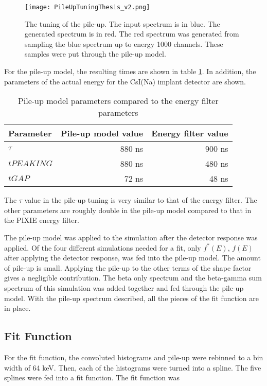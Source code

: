 \documentclass[../MaxHughesThesis.tex]{subfiles}
\begin{document}
\begin{figure}[!htb]
	\centerline{\texttt{[image: PileUpTuningThesis\_v2.png]}}
	\caption{The tuning of the pile-up.
		 The input spectrum is in blue.
		 The generated spectrum is in red.
		 The red spectrum was generated from sampling the blue spectrum up to energy 1000 channels.
		 These samples were put through the pile-up model.}
	\label{fig:pileuptune}
\end{figure}
For the pile-up model, the resulting times are shown in table \ref{tab:tunepileupmodel}.
In addition, the parameters of the actual energy for the CsI(Na) implant detector are shown.

\begin{table}[!hbt]
	\centering
	\caption{Pile-up model parameters compared to the energy filter parameters}
		\begin{tabular}{lrr}
		Parameter & Pile-up model value & Energy filter value \\ \hline
		$\tau$ & 880 ns & 900 ns \\
		$tPEAKING$ & 880 ns & 480 ns \\
		$tGAP$ & 72 ns & 48 ns  
		\end{tabular}
		\label{tab:tunepileupmodel}
\end{table}
The $\tau$ value in the pile-up tuning is very similar to that of the energy filter.
The other parameters are roughly double in the pile-up model compared to that in the PIXIE energy filter.

The pile-up model was applied to the simulation after the detector response was applied. 
Of the four different simulations needed for a fit, only $f^{*}(E)$, $f(E)$ after applying the detector response, was fed into the pile-up model.
The amount of pile-up is small. 
Applying the pile-up to the other terms of the shape factor gives a negligible contribution.
The beta only spectrum and the beta-gamma sum spectrum of this simulation was added together and fed through the pile-up model.
With the pile-up spectrum described, all the pieces of the fit function are in place.

\subsection{Fit Function}
For the fit function, the convoluted histograms and pile-up were rebinned to a bin width of 64 keV.
Then, each of the histograms were turned into a spline. 
The five splines were fed into a fit function.
The fit function was
\end{document}

